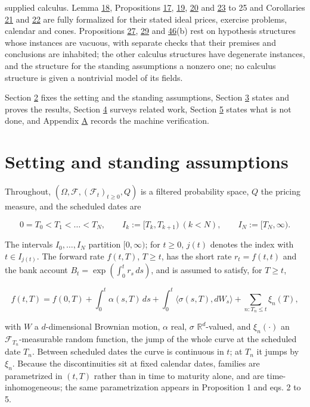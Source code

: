 \documentclass[11pt]{article}
\begin{document}
supplied calculus. Lemma \hyperref[res:Lemma-18]{18}, Propositions \hyperref[res:Proposition-17]{17}, \hyperref[res:Proposition-19]{19}, \hyperref[res:Proposition-20]{20} and \hyperref[res:Proposition-23]{23} to 25 and Corollaries \hyperref[res:Corollary-21]{21} and \hyperref[res:Corollary-22]{22} are fully formalized for their stated ideal prices, exercise problems, calendar and cones. Propositions \hyperref[res:Proposition-27]{27}, \hyperref[res:Proposition-29]{29} and \hyperref[res:Proposition-46]{46}(b) rest on hypothesis structures whose instances are vacuous, with separate checks that their premises and conclusions are inhabited; the other calculus structures have degenerate instances, and the structure for the standing assumptions a nonzero one; no calculus structure is given a nontrivial model of its fields.

Section \hyperref[sec:2]{2} fixes the setting and the standing assumptions, Section \hyperref[sec:3]{3} states and proves the results, Section \hyperref[sec:4]{4} surveys related work, Section \hyperref[sec:5]{5} states what is not done, and Appendix \hyperref[sec:A]{A} records the machine verification.

\section{Setting and standing assumptions}\label{sec:2}

Throughout, \((\Omega, \mathcal F, (\mathcal F_t)_{t \ge 0}, Q)\) is a filtered probability space, \(Q\) the pricing measure, and the scheduled dates are

\begin{equation*}
0 = T_0 < T_1 < \dots < T_N, \qquad I_k := [T_k, T_{k+1}) \ (k < N), \qquad I_N := [T_N, \infty). \tag{2.1}\label{eq:2.1}
\end{equation*}

The intervals \(I_0, \dots, I_N\) partition \([0, \infty)\); for \(t \ge 0\), \(j(t)\) denotes the index with \(t \in I_{j(t)}\). The forward rate \(f(t, T)\), \(T \ge t\), has the short rate \(r_t = f(t, t)\) and the bank account \(B_t = \exp(\int_0^t r_s\,ds)\), and is assumed to satisfy, for \(T \ge t\),

\begin{equation*}
f(t, T) = f(0, T) + \int_0^t \alpha(s, T)\,ds + \int_0^t \langle \sigma(s, T), dW_s \rangle + \sum_{n : T_n \le t} \xi_n(T), \tag{2.2}\label{eq:2.2}
\end{equation*}

with \(W\) a \(d\)-dimensional Brownian motion, \(\alpha\) real, \(\sigma\) \(\mathbb R^d\)-valued, and \(\xi_n(\cdot)\) an \(\mathcal F_{T_n}\)-measurable random function, the jump of the whole curve at the scheduled date \(T_n\). Between scheduled dates the curve is continuous in \(t\); at \(T_n\) it jumps by \(\xi_n\). Because the discontinuities sit at fixed calendar dates, families are parametrized in \((t, T)\) rather than in time to maturity alone, and are time-inhomogeneous; the same parametrization appears in \cite{kim2014jumps} Proposition 1 and \cite{brace2024sofr} eqs. 2 to 5.
\end{document}
